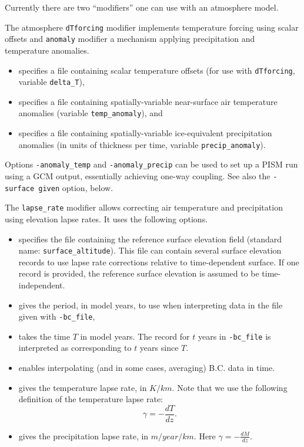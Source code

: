   Currently there are two ``modifiers'' one can use with an atmosphere model.

  The atmosphere \texttt{dTforcing} modifier implements temperature forcing using scalar offsets and \texttt{anomaly} modifier a mechanism applying precipitation and temperature anomalies.
  \begin{itemize}
  \item {} specifies a file containing scalar temperature offsets (for use with \texttt{dTforcing}, variable \texttt{delta_T}), 
  \item {} specifies a file containing spatially-variable near-surface air temperature anomalies (variable \texttt{temp_anomaly}), and
  \item {} specifies a file containing spatially-variable ice-equivalent precipitation anomalies (in units of thickness per time, variable \texttt{precip_anomaly}).
  \end{itemize}

  Options \texttt{-anomaly_temp} and \texttt{-anomaly_precip} can be used to set up a PISM run using a GCM output, essentially achieving one-way coupling. See also the \texttt{-surface given} option, below.

 The \texttt{lapse_rate} modifier allows correcting air temperature and precipitation using elevation lapse rates. It uses the following options.
  \begin{itemize}
  \item {} specifies the file containing the reference surface elevation field (standard name: \texttt{surface_altitude}). This file can contain several surface elevation records to use lapse rate corrections relative to time-dependent surface. If one record is provided, the reference surface elevation is assumed to be time-independent.
  \item {} gives the period, in model years, to use when interpreting data in the file given with \texttt{-bc_file},
  \item {} takes the time $T$ in model years. The record for $t$ years in \texttt{-bc_file} is interpreted as corresponding to $t$ years since $T$.
  \item {} enables interpolating (and in some cases, averaging) B.C. data in time.
  \item {} gives the temperature lapse rate, in $K/km$. Note that we use the following definition of the temperature lapse rate:
    \begin{displaymath}
      \gamma = -\frac{dT}{dz}.
    \end{displaymath}
  \item {} gives the precipitation lapse rate, in $m/year/km$. Here $\gamma = -\frac{dM}{dz}$.
  \end{itemize}

